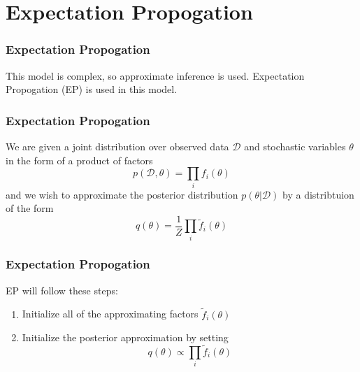 \documentclass{beamer}
\newcounter{sauvegardeenumi}
\newcommand{\asuivre}{\setcounter{sauvegardeenumi}{\theenumi}}
\newcommand{\tf}{\tilde{f}}
\newcommand{\mD}{\mathcal{D}}
\begin{document}
\section{Expectation Propogation}
\begin{frame}
    \frametitle{Expectation Propogation}
    This model is complex, so approximate inference is used. Expectation Propogation (EP) is used in this model.
\end{frame}
\begin{frame}
    \frametitle{Expectation Propogation}
    We are given a joint distribution over observed data $\mathcal{D}$ and stochastic variables $\theta$ in the form of a product of factors
    \begin{equation*}
	p(\mD, \theta) = \prod_i f_i (\theta)
    \end{equation*}
    and we wish to approximate the posterior distribution $p(\theta|\mD)$ by a distribtuion of the form 
    \begin{equation*}
	q(\theta) = \frac{1}{Z}\prod_i \tf_i(\theta)
    \end{equation*}
\end{frame}
\begin{frame}
    \frametitle{Expectation Propogation}
    EP will follow these steps:
    \begin{enumerate}
	\item Initialize all of the approximating factors $\tf_i(\theta)$	
	\item Initialize the posterior approximation by setting 
	    \begin{equation*}
		q(\theta) \propto \prod_i \tf_i(\theta)
	    \end{equation*}
	    \asuivre
    \end{enumerate}
\end{frame}
\end{document}
